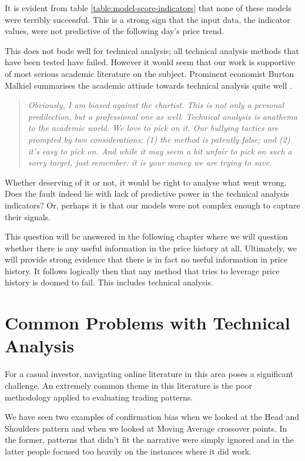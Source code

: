 \documentclass{report}
\begin{document}
It is evident from table \ref{table:model-score-indicators} that none of these models were terribly successful. This is a strong sign that the input data, the indicator values, were not predictive of the following day's price trend.

This does not bode well for technical analysis; all technical analysis methods that have been tested have failed. However it would seem that our work is supportive of most serious academic literature on the subject. Prominent economist Burton Malkiel summarises the academic attiude towards technical analysis quite well \cite{malkielrandomwalk}.

\begin{quotation}
\textit{Obviously, I am biased against the chartist. This is not only a personal predilection, but a professional one as well. Technical analysis is anathema to the academic world. We love
to pick on it. Our bullying tactics are prompted by two considerations: (1) the method is
patently false; and (2) it's easy to pick on. And while it may seem a bit unfair to pick on
such a sorry target, just remember: it is your money we are trying to save.}  
\end{quotation}

Whether deserving of it or not, it would be right to analyse what went wrong. Does the fault indeed lie with lack of predictive power in the technical analysis indicators? Or, perhaps it is that our models were not complex enough to capture their signals.

This question will be answered in the following chapter where we will question whether there is any useful information in the price history at all. Ultimately, we will provide strong evidence that there is in fact no useful information in price history. It follows logically then that any method that tries to leverage price history is doomed to fail. This includes technical analysis.

\section{Common Problems with Technical Analysis}

For a casual investor, navigating online literature in this area poses a significant challenge. An extremely common theme in this literature is the poor methodology applied to evaluating trading patterns.

We have seen two examples of confirmation bias when we looked at the Head and Shoulders pattern and when we looked at Moving Average crossover points. In the former, patterns that didn't fit the narrative were simply ignored and in the latter people focused too heavily on the instances where it did work.
\end{document}
